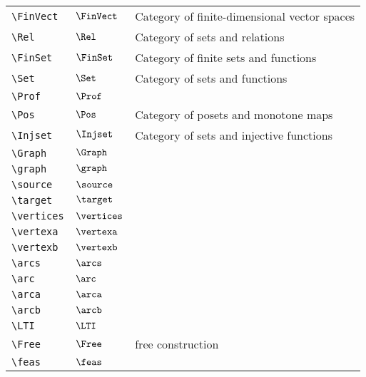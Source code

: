 \begin{longtable}{lll}
 {\color[rgb]{0.5,0.5,0.5}\texttt{\textbackslash FinVect}} & $\FinVect$ &  Category of finite-dimensional vector spaces\\ 
 {\color[rgb]{0.5,0.5,0.5}\texttt{\textbackslash Rel}} & $\Rel$ &  Category of sets and relations\\ 
 {\color[rgb]{0.5,0.5,0.5}\texttt{\textbackslash FinSet}} & $\FinSet$ &  Category of finite sets and functions\\ 
 {\color[rgb]{0.5,0.5,0.5}\texttt{\textbackslash Set}} & $\Set$ &  Category of sets and functions\\ 
 {\color[rgb]{0.5,0.5,0.5}\texttt{\textbackslash Prof}} & $\Prof$ & \\ 
 {\color[rgb]{0.5,0.5,0.5}\texttt{\textbackslash Pos}} & $\Pos$ &  Category of posets and monotone maps\\ 
 {\color[rgb]{0.5,0.5,0.5}\texttt{\textbackslash Injset}} & $\Injset$ &  Category of sets and injective functions\\ 
 {\color[rgb]{0.5,0.5,0.5}\texttt{\textbackslash Graph}} & $\Graph$ & \\ 
 {\color[rgb]{0.5,0.5,0.5}\texttt{\textbackslash graph}} & $\graph$ & \\ 
 {\color[rgb]{0.5,0.5,0.5}\texttt{\textbackslash source}} & $\source$ & \\ 
 {\color[rgb]{0.5,0.5,0.5}\texttt{\textbackslash target}} & $\target$ & \\ 
 {\color[rgb]{0.5,0.5,0.5}\texttt{\textbackslash vertices}} & $\vertices$ & \\ 
 {\color[rgb]{0.5,0.5,0.5}\texttt{\textbackslash vertexa}} & $\vertexa$ & \\ 
 {\color[rgb]{0.5,0.5,0.5}\texttt{\textbackslash vertexb}} & $\vertexb$ & \\ 
 {\color[rgb]{0.5,0.5,0.5}\texttt{\textbackslash arcs}} & $\arcs$ & \\ 
 {\color[rgb]{0.5,0.5,0.5}\texttt{\textbackslash arc}} & $\arc$ & \\ 
 {\color[rgb]{0.5,0.5,0.5}\texttt{\textbackslash arca}} & $\arca$ & \\ 
 {\color[rgb]{0.5,0.5,0.5}\texttt{\textbackslash arcb}} & $\arcb$ & \\ 
 {\color[rgb]{0.5,0.5,0.5}\texttt{\textbackslash LTI}} & $\LTI$ & \\ 
 {\color[rgb]{0.5,0.5,0.5}\texttt{\textbackslash Free}} & $\Free$ &  free construction\\ 
 {\color[rgb]{0.5,0.5,0.5}\texttt{\textbackslash feas}} & $\feas$ & \\ 

\end{longtable}
